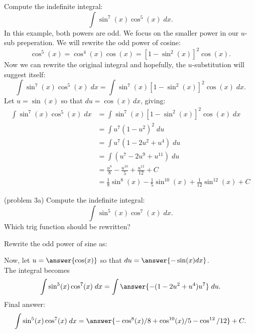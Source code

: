 \documentclass{ximera}
\begin{document}
\begin{example}[example 3]
Compute the indefinite integral:
\[
\int \sin^7(x)\cos^5(x) \; dx.
\]
In this example, both powers are odd.  We focus on the smaller power in our $u$-sub preperation.
We will rewrite the odd power of cosine:
\[
\cos^5(x) = \cos^4(x) \cos(x) = \left[1-\sin^2(x)\right]^2 \cos(x).
\]
Now we can rewrite the original integral and hopefully, the $u$-substitution will suggest itself:
\[
\int \sin^7(x)\cos^5(x) \; dx = \int \sin^7(x)\left[1 - \sin^2(x)\right]^2 \cos(x) \; dx.
\]
Let $u = \sin(x)$ so that $du = \cos(x) \, dx$, giving:
\begin{align*}
\int \sin^7(x)\cos^5(x) \; dx &= \int \sin^7(x)\left[1 - \sin^2(x)\right]^2 \cos(x) \; dx\\
   &= \int u^7 (1-u^2)^2 \; du\\
   &= \int u^7(1 - 2u^2 + u^4) \; du\\
   &= \int (u^7 - 2u^9 + u^{11}) \; du\\
  &= \frac{u^8}{8} - \frac{u^{10}}{5} + \frac{u^{12}}{12}+ C \\
  &= \frac18 \sin^8(x) - \frac15 \sin^{10}(x) + \frac{1}{12} \sin^{12}(x)+ C
\end{align*}

\end{example}





\begin{problem}(problem 3a)
Compute the indefinite integral:
\[
\int \sin^5(x)\cos^7(x) \; dx.
\]
Which trig function should be rewritten?
\begin{multipleChoice}
\end{multipleChoice}
Rewrite the odd power of sine as:
\begin{multipleChoice}

\end{multipleChoice}

Now, let $u = \answer{\cos(x)}$ so that $du = \answer{-\sin(x) dx}$.\\
The integral becomes
\[
\int \sin^5(x)\cos^7(x) \; dx= \int \answer{-(1-2u^2 + u^4)u^7} \; du.
\]
Final answer:
\[
\int \sin^5(x)\cos^7(x) \; dx= \answer{-\cos^8(x)/8 + \cos^{10}(x)/5 - \cos^{12}/12} + C.
\]
\end{problem}
\end{document}
